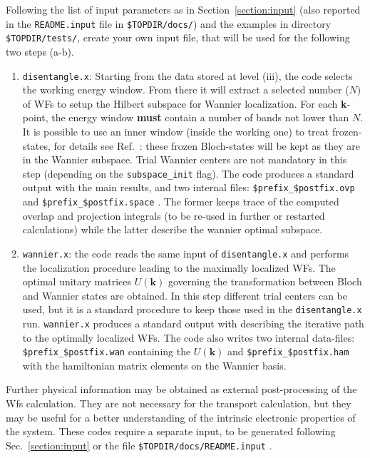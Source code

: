 Following the list of input parameters as in
Section~\ref{section:input} (also reported in the {\tt README.input} file
in {\tt \$TOPDIR/docs/}) and the examples in directory {\tt \$TOPDIR/tests/}, 
create your own input file, that will be used for the following two steps (a-b).
\renewcommand{\theenumi}{\alph{enumi}}
\renewcommand{\labelenumi}{\theenumi)}
%
%
\begin{enumerate}
\item {\tt disentangle.x}: Starting from the data stored at level (iii), 
      the code selects the working energy window. From there
      it will extract a selected number ($N$) of WFs to setup the 
      Hilbert subspace for Wannier localization.
      For each \textbf{k}-point, the energy window {\bf must}
      contain a number of bands not lower than $N$.
      It is possible to use an inner window (inside the working one) to
      treat frozen-states, for details see Ref.~\cite{ivo2}:
      these frozen Bloch-states will be kept as they are in the Wannier subspace.
      Trial Wannier centers are not mandatory in this step (depending
      on the {\tt subspace\_init} flag).
      The code produces a standard output with the main results,
      and two internal files: {\tt \$prefix\_\$postfix.ovp} and
      {\tt \$prefix\_\$postfix.space} . The former keeps trace of the 
      computed overlap and projection integrals (to be re-used in further 
      or restarted calculations) while the latter describe the wannier optimal 
      subspace.

\item {\tt wannier.x}: the code reads the same input of {\tt disentangle.x} and
      performs the localization
      procedure leading to the maximally localized WFs. 
      The optimal unitary matrices $U(\mathbf{k})$ governing the transformation between
      Bloch and Wannier states are obtained.
      In this step different trial centers can be used, but it is a standard procedure
      to keep those used in the {\tt disentangle.x} run.
      {\tt wannier.x} produces a standard output with describing the iterative
      path to the optimally localized WFs. 
      The code also writes two internal data-files: {\tt \$prefix\_\$postfix.wan}
      containing the $U(\mathbf{k})$ and {\tt \$prefix\_\$postfix.ham} with the 
      hamiltonian matrix elements on the Wannier basis.
\end{enumerate}
%
%

\noindent
Further physical information may be obtained as external
post-processing of the Wfs calculation. They are not necessary for
the transport calculation, but they may be useful for a
better understanding of the intrinsic electronic properties of the
system. These codes require a separate input, to be generated
following Sec.~\ref{section:input} or the file
{\tt \$TOPDIR/docs/README.input} .

